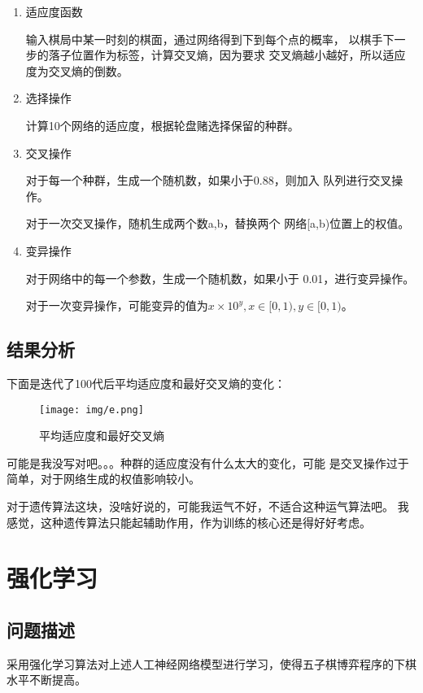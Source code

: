 \documentclass[UTF8]{article}
\begin{document}
\begin{enumerate}
    \item 适应度函数
    
    \subitem 输入棋局中某一时刻的棋面，通过网络得到下到每个点的概率，
    以棋手下一步的落子位置作为标签，计算交叉熵，因为要求
    交叉熵越小越好，所以适应度为交叉熵的倒数。

    \item 选择操作
    
    \subitem 计算10个网络的适应度，根据轮盘赌选择保留的种群。

    \item 交叉操作
    
    \subitem 对于每一个种群，生成一个随机数，如果小于0.88，则加入
    队列进行交叉操作。

    \subitem 对于一次交叉操作，随机生成两个数a,b，替换两个
    网络[a,b)位置上的权值。

    \item 变异操作
    
    \subitem 对于网络中的每一个参数，生成一个随机数，如果小于
    0.01，进行变异操作。

    \subitem 对于一次变异操作，可能变异的值为$x\times10^y,x\in [0,1),y\in [0,1)$。

\end{enumerate}

\subsection{结果分析}

下面是迭代了100代后平均适应度和最好交叉熵的变化：

\begin{figure}[H]
    \centering
    \texttt{[image: img/e.png]}
    \caption{平均适应度和最好交叉熵}
\end{figure}

可能是我没写对吧。。。种群的适应度没有什么太大的变化，可能
是交叉操作过于简单，对于网络生成的权值影响较小。

对于遗传算法这块，没啥好说的，可能我运气不好，不适合这种运气算法吧。
我感觉，这种遗传算法只能起辅助作用，作为训练的核心还是得好好考虑。

\section{强化学习}
\subsection{问题描述}
采用强化学习算法对上述人工神经网络模型进行学习，使得五子棋博弈程序的下棋
水平不断提高。
\end{document}
